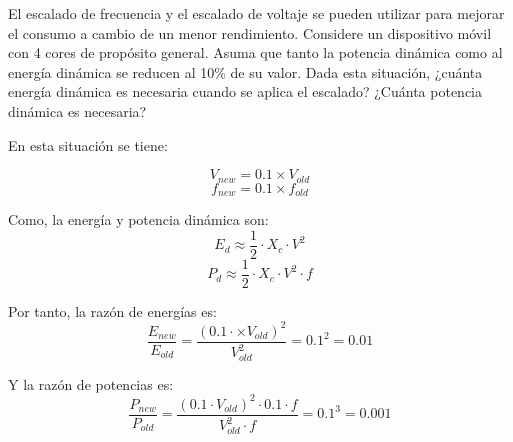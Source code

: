 \begin{acexercise}
\end{acexercise}

El escalado de frecuencia y el escalado de voltaje se pueden utilizar para
mejorar el consumo a cambio de un menor rendimiento. Considere un dispositivo
móvil con 4 cores de propósito general. Asuma que tanto la potencia dinámica
como al energía dinámica se reducen al 10\% de su valor. Dada esta situación,
¿cuánta energía dinámica es necesaria cuando se aplica el escalado? ¿Cuánta
potencia dinámica es necesaria?

\begin{acsolution}
\end{acsolution}

En esta situación se tiene:

\[V_{new} = 0.1 \times V_{old}\]
\[f_{new} = 0.1 \times f_{old}\]

Como, la energía y potencia dinámica son:
\[
E_d \approx \frac{1}{2} \cdot X_c \cdot V^2
\]
\[
P_d \approx \frac{1}{2} \cdot X_c \cdot V^2 \cdot f
\]

Por tanto, la razón de energías es:
\[
\frac{E_{new}}{E_{old}} =
\frac{(0.1 \cdot \times V_{old})^2}{V_{old}^2} =
0.1^2 =
0.01
\] 

Y la razón de potencias es:
\[
\frac{P_{new}}{P_{old}} =
\frac{(0.1 \cdot V_{old})^2 \cdot 0.1 \cdot f}{V_{old}^2 \cdot f} =
0.1^3 =
0.001
\]
